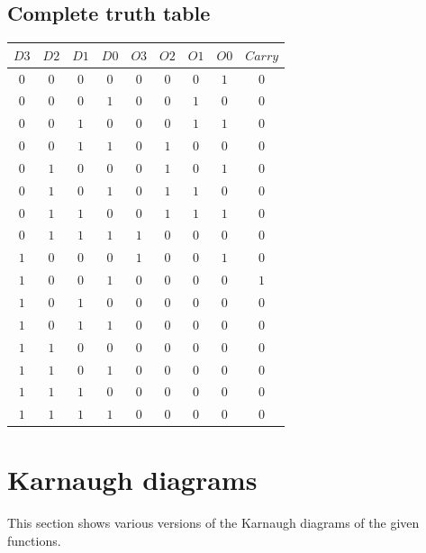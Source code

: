 \documentclass [15pt,a4paper,twoside]{article}
\begin{document}
\subsection{Complete truth table}
\begin{center}
\begin{tabular}{cccc|ccccc}
$D3$&$D2$&$D1$&$D0$&$O3$&$O2$&$O1$&$O0$&$Carry$\\
\hline
$0$&$0$&$0$&$0$&$0$&$0$&$0$&$1$&$0$\\
$0$&$0$&$0$&$1$&$0$&$0$&$1$&$0$&$0$\\
$0$&$0$&$1$&$0$&$0$&$0$&$1$&$1$&$0$\\
$0$&$0$&$1$&$1$&$0$&$1$&$0$&$0$&$0$\\
$0$&$1$&$0$&$0$&$0$&$1$&$0$&$1$&$0$\\
$0$&$1$&$0$&$1$&$0$&$1$&$1$&$0$&$0$\\
$0$&$1$&$1$&$0$&$0$&$1$&$1$&$1$&$0$\\
$0$&$1$&$1$&$1$&$1$&$0$&$0$&$0$&$0$\\
$1$&$0$&$0$&$0$&$1$&$0$&$0$&$1$&$0$\\
$1$&$0$&$0$&$1$&$0$&$0$&$0$&$0$&$1$\\
$1$&$0$&$1$&$0$&$0$&$0$&$0$&$0$&$0$\\
$1$&$0$&$1$&$1$&$0$&$0$&$0$&$0$&$0$\\
$1$&$1$&$0$&$0$&$0$&$0$&$0$&$0$&$0$\\
$1$&$1$&$0$&$1$&$0$&$0$&$0$&$0$&$0$\\
$1$&$1$&$1$&$0$&$0$&$0$&$0$&$0$&$0$\\
$1$&$1$&$1$&$1$&$0$&$0$&$0$&$0$&$0$\\

\end{tabular}
\end{center}
\section{Karnaugh diagrams}
This section shows various versions of the Karnaugh diagrams of the given functions.
\end{document}
